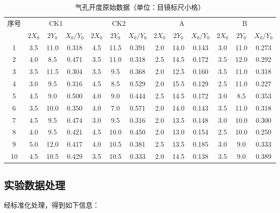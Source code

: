 \documentclass[10.5pt]{config}
\begin{document}
\begin{table}[h]
    \centering
    \caption{气孔开度原始数据（单位：目镜标尺小格）}
    \label{tab:raw_data_corrected_v3}
    \footnotesize %
    \setlength{\tabcolsep}{5pt} %
    \begin{tabular}{ccccccccccccc}
        \toprule
        \multirow{2}{*}{序号} & \multicolumn{3}{c}{CK1} & \multicolumn{3}{c}{CK2} & \multicolumn{3}{c}{A} & \multicolumn{3}{c}{B} \\
        \cmidrule(lr){2-4} \cmidrule(lr){5-7} \cmidrule(lr){8-10} \cmidrule(lr){11-13}
        & $2X_0$ & $2Y_0$ & $X_0/Y_0$ & $2X_0$ & $2Y_0$ & $X_0/Y_0$ & $2X_0$ & $2Y_0$ & $X_0/Y_0$ & $2X_0$ & $2Y_0$ & $X_0/Y_0$ \\
        \midrule
        1 & 3.5 & 11.0 & 0.318 & 4.5 & 11.5 & 0.391 & 2.0 & 14.0 & 0.143 & 3.0 & 11.0 & 0.273 \\
        2 & 4.0 & 8.5 & 0.471 & 3.5 & 11.0 & 0.318 & 2.5 & 14.5 & 0.172 & 3.5 & 12.0 & 0.292 \\
        3 & 3.5 & 11.5 & 0.304 & 3.5 & 9.5 & 0.368 & 2.0 & 12.5 & 0.160 & 3.5 & 11.0 & 0.318 \\
        4 & 3.0 & 9.5 & 0.316 & 4.5 & 8.5 & 0.529 & 2.0 & 15.5 & 0.129 & 2.5 & 11.0 & 0.227 \\
        5 & 4.5 & 9.0 & 0.500 & 4.0 & 9.0 & 0.444 & 2.5 & 14.5 & 0.172 & 3.0 & 8.5 & 0.353 \\
        6 & 3.5 & 10.0 & 0.350 & 4.0 & 7.0 & 0.571 & 2.0 & 14.0 & 0.143 & 3.5 & 11.0 & 0.318 \\
        7 & 4.5 & 9.5 & 0.474 & 3.0 & 9.5 & 0.316 & 2.0 & 13.5 & 0.148 & 3.0 & 10.0 & 0.300 \\
        8 & 4.0 & 9.5 & 0.421 & 4.5 & 10.0 & 0.450 & 2.0 & 13.0 & 0.154 & 2.5 & 10.0 & 0.250 \\
        9 & 5.0 & 12.0 & 0.417 & 4.0 & 10.5 & 0.381 & 2.5 & 13.5 & 0.185 & 3.0 & 9.0 & 0.333 \\
        10 & 4.5 & 10.5 & 0.429 & 3.5 & 10.5 & 0.333 & 2.0 & 14.5 & 0.138 & 3.5 & 9.0 & 0.389 \\
        \bottomrule
    \end{tabular}
\end{table}

\subsection{实验数据处理}

经标准化处理，得到如下信息：
\end{document}
